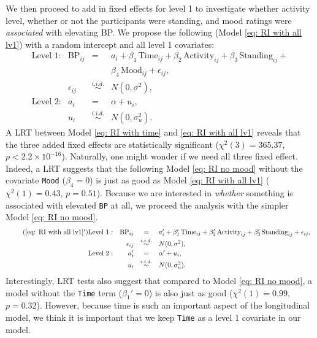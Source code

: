 \documentclass[12pt,twoside,letterpaper]{article}
\theoremstyle{definition}
\theoremstyle{definition}
\begin{document}
We then proceed to add in fixed effects for level 1 to investigate whether activity level, whether or not the participants were standing, and mood ratings were \emph{associated} with elevating BP. We propose the following (Model \ref{eq: RI with all lv1}) with a random intercept and all level 1 covariates:
\begin{equation}\label{eq: RI with all lv1}
    \begin{array}{rrcll}
        \text{Level 1}: & \text{BP}_{ij} &=& a_i + \beta_1\, \text{Time}_{ij} + \beta_2\, \text{Activity}_{ij} + \beta_3\, \text{Standing}_{ij} + \\
        &&& \beta_4\, \text{Mood}_{ij} + \epsilon_{ij}, \\[0.5ex]
         & \epsilon_{ij} &\overset{i.i.d.}{\sim}& N(0, \sigma^2), \\[0.5ex]
        \text{Level 2}: & a_i &=& \alpha + u_i, \\[0.5ex]
         & u_{i} &\overset{i.i.d.}{\sim}& N(0, \sigma_u^2).
    \end{array}
\end{equation}
A LRT between Model \ref{eq: RI with time} and \ref{eq: RI with all lv1} reveals that the three added fixed effects are statistically significant ($\chi^2 (3) = 365.37$, $p < 2.2 \times 10^{-16}$). Naturally, one might wonder if we need all three fixed effect. Indeed, a LRT suggests that the following Model \ref{eq: RI no mood} without the covariate \texttt{Mood} ($\beta_4 = 0$) is just as good as Model \ref{eq: RI with all lv1} ($\chi^2 (1) = 0.43$, $p =0.51$). Because we are interested in \emph{whether} something is associated with elevated \texttt{BP} at all, we proceed the analysis with the simpler Model \ref{eq: RI no mood}.
\begin{equation}\label{eq: RI no mood}
    \begin{array}{rrcll}\tag{\ref{eq: RI with all lv1}$'$}
        \text{Level 1}: & \text{BP}_{ij} &=& a_i' + \beta_1'\, \text{Time}_{ij} + \beta_2'\, \text{Activity}_{ij} + \beta_3'\, \text{Standing}_{ij} + \epsilon_{ij}, \\[0.5ex]
         & \epsilon_{ij} &\overset{i.i.d.}{\sim}& N(0, \sigma^2), \\[0.5ex]
        \text{Level 2}: & a_i' &=& \alpha' + u_i, \\[0.5ex]
         & u_{i} &\overset{i.i.d.}{\sim}& N(0, \sigma_u^2).
    \end{array}
\end{equation}
Interestingly, LRT tests also suggest that compared to Model \ref{eq: RI no mood}, a model without the \texttt{Time} term ($\beta_1' = 0$) is also just as good ($\chi^2 (1) = 0.99$, $p = 0.32$). However, because time is such an important aspect of the longitudinal model, we think it is important that we keep \texttt{Time} as a level 1 covariate in our model.
\end{document}
